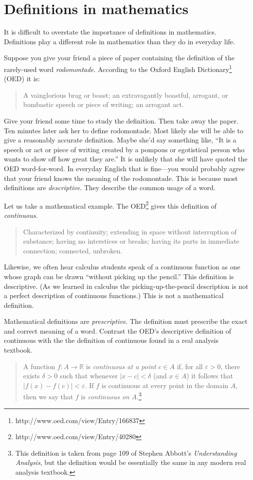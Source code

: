 \chapter{Definitions in mathematics}
\label{appendix:definitions}

It is difficult to overstate the importance of definitions in mathematics. Definitions play a different role in mathematics than they do in everyday life. 

Suppose you give your friend a piece of paper containing the definition of the rarely-used word \emph{rodomontade}. According to the Oxford English Dictionary\footnote{http://www.oed.com/view/Entry/166837} (OED) it is:
\begin{quote}
A vainglorious brag or boast; an extravagantly boastful, arrogant, or bombastic speech or piece of writing; an arrogant act.
\end{quote}
Give your friend some time to study the definition. Then take away the paper. Ten minutes later ask her to define rodomontade. Most likely she will be able to give a reasonably accurate definition. Maybe she'd say something like, ``It is a speech or act or piece of writing created by a pompous or egotistical person who wants to show off how great they are.'' It is unlikely that she will have quoted the OED word-for-word. In everyday English that is fine---you would probably agree that your friend knows the meaning of the rodomontade. This is because most definitions are \emph{descriptive}. They describe the common usage of a word. 

Let us take a mathematical example. The OED\footnote{http://www.oed.com/view/Entry/40280}  gives this definition of \emph{continuous}.
\begin{quote}
Characterized by continuity; extending in space without interruption of substance; having no interstices or breaks; having its parts in immediate connection; connected, unbroken.
\end{quote}

Likewise, we often hear calculus students speak of a continuous function as one whose graph can be drawn ``without picking up the pencil.'' This definition is descriptive. (As we learned in calculus the picking-up-the-pencil description is not a perfect description of continuous functions.) This is not a mathematical definition. 

Mathematical definitions are \emph{prescriptive}. The definition must prescribe the exact and correct meaning  of a word. Contrast the OED's descriptive definition of continuous with the the definition of continuous found in a real analysis textbook.
\begin{quote}
A function $f:A\to \mathbb{R}$ is \emph{continuous at a point} $c\in A$ if,  for all $\varepsilon>0$, there exists $\delta>0$ such that whenever $|x-c|<\delta$ (and $x\in A$) it follows that $|f(x)-f(c)|<\varepsilon$. If $f$ is continuous at every point in the domain $A$, then we say that $f$ is \emph{continuous on} $A$.\footnote{This definition is taken from page 109 of Stephen Abbott's \emph{Understanding Analysis}, but the definition would be essentially the same in any modern real analysis textbook.} 
\end{quote}

